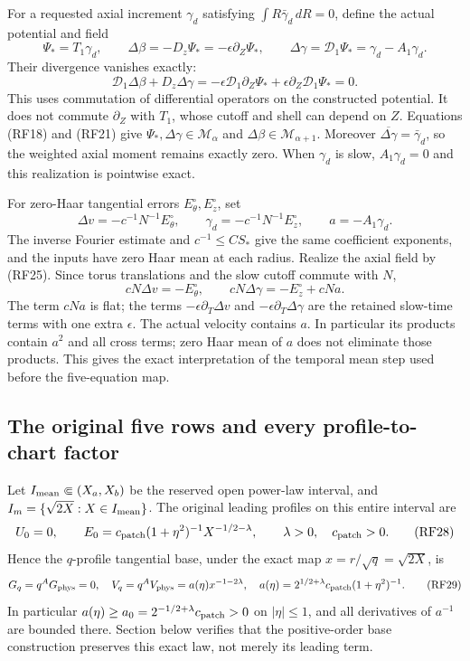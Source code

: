 \documentclass[10pt,a4paper]{article}
\begin{document}
For a requested axial increment \(\gamma_d\) satisfying
\(\int R\bar\gamma_d\,dR=0\), define the actual potential and field
\[
\Psi_*=T_1\gamma_d,\qquad
\Delta\beta=-D_z\Psi_*=-\epsilon\partial_Z\Psi_*,\qquad
\Delta\gamma=\mathcal D_1\Psi_*
=\gamma_d-A_1\gamma_d.
\tag{RF25}
\]
Their divergence vanishes exactly:
\[
\mathcal D_1\Delta\beta+D_z\Delta\gamma
=-\epsilon\mathcal D_1\partial_Z\Psi_*
+\epsilon\partial_Z\mathcal D_1\Psi_*=0.
\]
This uses commutation of differential operators on the constructed
potential. It does not commute \(\partial_Z\) with \(T_1\),
whose cutoff and shell can depend on \(Z\). Equations (RF18) and
(RF21) give
\(\Psi_*,\Delta\gamma\in\mathcal M_\alpha\) and
\(\Delta\beta\in\mathcal M_{\alpha+1}\). Moreover
\(\overline{\Delta\gamma}=\bar\gamma_d\), so the weighted
axial moment remains exactly zero. When \(\gamma_d\) is slow,
\(A_1\gamma_d=0\) and this realization is pointwise exact.

For zero-Haar tangential errors \(E_\theta^\circ,E_z^\circ\), set
\[
\Delta v=-c^{-1}N^{-1}E_\theta^\circ,\qquad
\gamma_d=-c^{-1}N^{-1}E_z^\circ,\qquad a=-A_1\gamma_d.
\tag{RF26}
\]
The inverse Fourier estimate and \(c^{-1}\le CS_*\) give the
same coefficient exponents, and the inputs have zero Haar mean at
each radius. Realize the axial field by (RF25). Since torus
translations and the slow cutoff commute with \(N\),
\[
cN\Delta v=-E_\theta^\circ,\qquad
cN\Delta\gamma=-E_z^\circ+cNa.
\tag{RF27}
\]
The term \(cNa\) is flat; the terms
\(-\epsilon\partial_T\Delta v\) and
\(-\epsilon\partial_T\Delta\gamma\) are the retained slow-time
terms with one extra \(\epsilon\). The actual velocity contains
\(a\). In particular its products contain \(a^2\) and all cross
terms; zero Haar mean of \(a\) does not eliminate those products.
This gives the exact interpretation of the temporal mean step used
before the five-equation map.

\subsection{The original five rows and every profile-to-chart factor}

Let \(I_{\rm mean}\Subset(X_a,X_b)\) be the reserved open
power-law interval, and \(I_m=\{\sqrt{2X}:X\in I_{\rm mean}\}\).
The original leading profiles on this entire interval are
\[
U_0=0,\qquad E_0=c_{\rm patch}(1+\eta^2)^{-1}X^{-1/2-\lambda},
\qquad \lambda>0,\quad c_{\rm patch}>0.
\tag{RF28}
\]
Hence the \(q\)-profile tangential base, under the exact map
\(x=r/\sqrt q=\sqrt{2X}\), is
\[
G_q=q^AG_{\rm phys}=0,\quad
V_q=q^AV_{\rm phys}=a(\eta)x^{-1-2\lambda},\quad
a(\eta)=2^{1/2+\lambda}c_{\rm patch}(1+\eta^2)^{-1}.
\tag{RF29}
\]
In particular \(a(\eta)\ge a_0=2^{-1/2+\lambda}c_{\rm patch}>0\)
on \(|\eta|\le1\), and all derivatives of \(a^{-1}\) are
bounded there. Section below verifies that the positive-order base
construction preserves this exact law, not merely its leading term.
\end{document}
